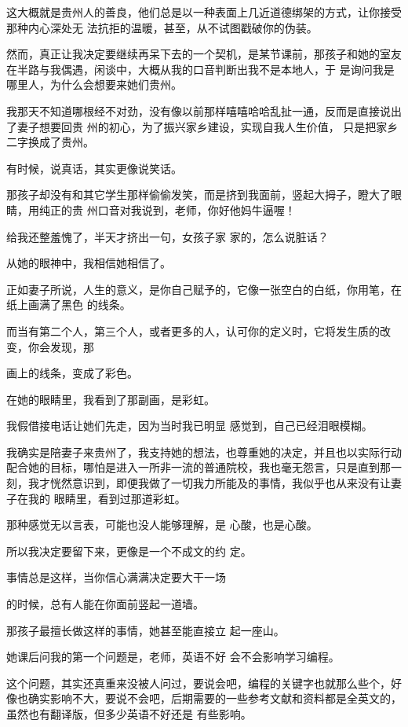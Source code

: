 \documentclass{article}
\begin{document}
这大概就是贵州人的善良，他们总是以一种表面上几近道德绑架的方式，让你接受那种内心深处无
法抗拒的温暖，甚至，从不试图戳破你的伪装。 

然而，真正让我决定要继续再呆下去的一个契机，是某节课前，那孩子和她的室友在半路与我偶遇，闲谈中，大概从我的口音判断出我不是本地人，于
是询问我是哪里人，为什么会想要来她们贵州。 

我那天不知道哪根经不对劲，没有像以前那样嘻嘻哈哈乱扯一通，反而是直接说出了妻子想要回贵
\newpage
州的初心，为了振兴家乡建设，实现自我人生价值，
只是把家乡二字换成了贵州。 


有时候，说真话，其实更像说笑话。 

那孩子却没有和其它学生那样偷偷发笑，而是挤到我面前，竖起大拇子，瞪大了眼睛，用纯正的贵
州口音对我说到，老师，你好他妈牛逼喔！ 

给我还整羞愧了，半天才挤出一句，女孩子家
家的，怎么说脏话？ 


从她的眼神中，我相信她相信了。 

正如妻子所说，人生的意义，是你自己赋予的，它像一张空白的白纸，你用笔，在纸上画满了黑色
的线条。 

而当有第二个人，第三个人，或者更多的人，认可你的定义时，它将发生质的改变，你会发现，那

\newpage
画上的线条，变成了彩色。 


在她的眼睛里，我看到了那副画，是彩虹。 

我假借接电话让她们先走，因为当时我已明显
感觉到，自己已经泪眼模糊。 

我确实是陪妻子来贵州了，我支持她的想法，也尊重她的决定，并且也以实际行动配合她的目标，哪怕是进入一所非一流的普通院校，我也毫无怨言，只是直到那一刻，我才恍然意识到，即便我做了一切我力所能及的事情，我似乎也从来没有让妻子在我的
眼睛里，看到过那道彩虹。 

那种感觉无以言表，可能也没人能够理解，是
心酸，也是心酸。 

所以我决定要留下来，更像是一个不成文的约
定。 


事情总是这样，当你信心满满决定要大干一场
\newpage

的时候，总有人能在你面前竖起一道墙。 

那孩子最擅长做这样的事情，她甚至能直接立
起一座山。 

她课后问我的第一个问题是，老师，英语不好
会不会影响学习编程。 

这个问题，其实还真重来没被人问过，要说会吧，编程的关键字也就那么些个，好像也确实影响不大，要说不会吧，后期需要的一些参考文献和资料都是全英文的，虽然也有翻译版，但多少英语不好还是
有些影响。 
\end{document}
